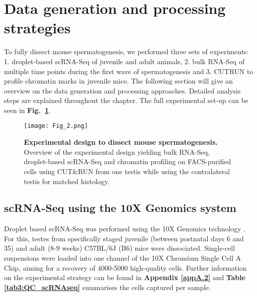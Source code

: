 
\section{Data generation and processing strategies}

To fully dissect mouse spermatogenesis, we performed three sets of experiments: 
1. droplet-based scRNA-Seq of juvenile and adult animals, 
2. bulk RNA-Seq of multiple time points during the first wave of spermatogenesis and 
3. \gls{CUTRUN} to profile chromatin marks in juvenile mice. The following section will give an overview on the data generation and processing approaches. 
Detailed analysis steps are explained throughout the chapter. 
The full experimental set-up can be seen in \textbf{Fig.~\ref{fig3:experimental_design}}.

\begin{figure}[!h]
\centering
\texttt{[image: Fig\_2.png]}
\caption[Experimental design to dissect mouse spermatogenesis]{\textbf{Experimental design to dissect mouse spermatogenesis.}\\
Overview of the experimental design yielding bulk RNA-Seq, droplet-based scRNA-Seq and chromatin profiling on FACS-purified cells using CUT\&{}RUN from one testis while using the contralateral testis for matched histology.}
\label{fig3:experimental_design}
\end{figure}

\subsection{scRNA-Seq using the 10X Genomics\texttrademark{} system}

Droplet based scRNA-Seq was performed using the 10X Genomics\texttrademark{} technology \citep{Zheng2017}. 
For this, testes from specifically staged juvenile (between postnatal days 6 and 35) and adult (8-9 weeks) C57BL/6J (B6) mice were dissociated. 
Single-cell suspensions were loaded into one channel of the 10X Chromium\texttrademark{} Single Cell A Chip, aiming for a recovery of 4000-5000 high-quality cells. 
Further information on the experimental strategy can be found in \textbf{Appendix \ref{appA.2}} and \textbf{Table \ref{tab3:QC_scRNAseq}} summarises the cells captured per sample.

\newpage

